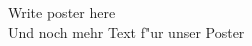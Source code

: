 \documentclass[portrait,a0,final]{a0poster}
\begin{document}
Write poster here \\
Und noch mehr Text f"ur unser Poster
\end{document}
